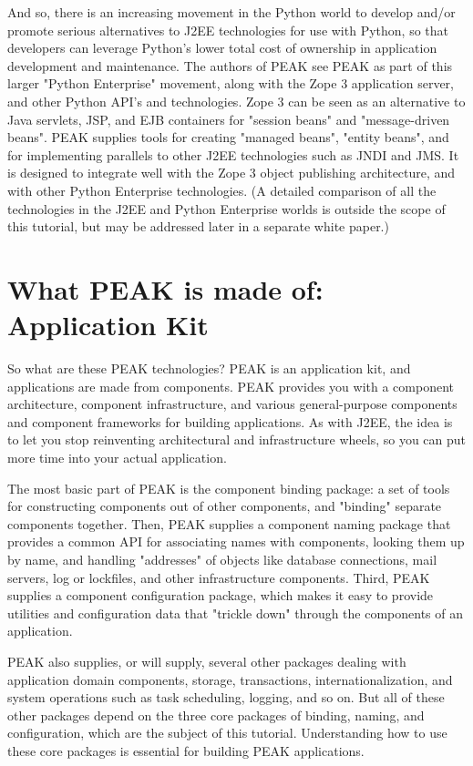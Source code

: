 And so, there is an increasing movement in the Python world to develop
and/or promote serious alternatives to J2EE technologies for use with
Python, so that developers can leverage Python's lower total cost of
ownership in application development and maintenance. The authors of
PEAK see PEAK as part of this larger "Python Enterprise" movement, along
with the Zope 3 application server, and other Python API's and
technologies. Zope 3 can be seen as an alternative to Java servlets,
JSP, and EJB containers for "session beans" and "message-driven beans".
PEAK supplies tools for creating "managed beans", "entity beans", and
for implementing parallels to other J2EE technologies such as JNDI and
JMS.  It is designed to integrate well with the Zope 3 object publishing
architecture, and with other Python Enterprise technologies. (A detailed
comparison of all the technologies in the J2EE and Python Enterprise
worlds is outside the scope of this tutorial, but may be addressed later
in a separate white paper.) 


\section{What PEAK is made of: Application Kit} 

So what are these PEAK technologies? PEAK is an application kit, and
applications are made from components.  PEAK provides you with a
component architecture, component infrastructure, and various
general-purpose components and component frameworks for building
applications. As with J2EE, the idea is to let you stop reinventing
architectural and infrastructure wheels, so you can put more time into
your actual application. 

The most basic part of PEAK is the component binding package: a set of
tools for constructing components out of other components, and "binding"
separate components together. Then, PEAK supplies a component naming
package that provides a common API for associating names with
components, looking them up by name, and handling "addresses" of objects
like database connections, mail servers, log or lockfiles, and other
infrastructure components. Third, PEAK supplies a component
configuration package, which makes it easy to provide utilities and
configuration data that "trickle down" through the components of an
application. 

PEAK also supplies, or will supply, several other packages dealing with
application domain components, storage, transactions,
internationalization, and system operations such as task scheduling,
logging, and so on. But all of these other packages depend on the three
core packages of binding, naming, and configuration, which are the
subject of this tutorial.  Understanding how to use these core packages
is essential for building PEAK applications. 

